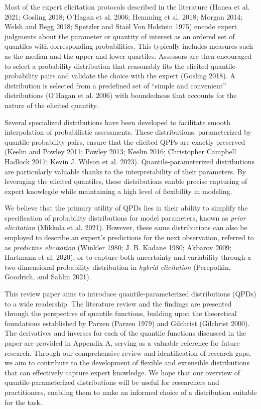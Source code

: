 \documentclass[
]{interact}
\begin{document}
Most of the expert elicitation protocols described in the literature
(Hanea et al. 2021; Gosling 2018; O'Hagan et al. 2006; Hemming et al.
2018; Morgan 2014; Welsh and Begg 2018; Spetzler and Staël Von Holstein
1975) encode expert judgments about the parameter or quantity of
interest as an ordered set of quantiles with corresponding
probabilities. This typically includes measures such as the median and
the upper and lower quartiles. Assessors are then encouraged to select a
probability distribution that reasonably fits the elicited
quantile-probability pairs and validate the choice with the expert
(Gosling 2018). A distribution is selected from a predefined set of
``simple and convenient'' distributions (O'Hagan et al. 2006) with
boundedness that accounts for the nature of the elicited quantity.

Several specialized distributions have been developed to facilitate
smooth interpolation of probabilistic assessments. These distributions,
parameterized by quantile-probability pairs, ensure that the elicited
QPPs are exactly preserved (Keelin and Powley 2011; Powley 2013; Keelin
2016; Christopher Campbell Hadlock 2017; Kevin J. Wilson et al. 2023).
Quantile-parameterized distributions are particularly valuable thanks to
the interpretability of their parameters. By leveraging the elicited
quantiles, these distributions enable precise capturing of expert
knowlegde while maintaining a high level of flexibility in modeling.

We believe that the primary utility of QPDs lies in their ability to
simplify the specification of probability distributions for model
parameters, known as \emph{prior elicitation} (Mikkola et al. 2021).
However, these same distributions can also be employed to describe an
expert's predictions for the next observation, referred to as
\emph{predictive elicitation} (Winkler 1980; J. B. Kadane 1980; Akbarov
2009; Hartmann et al. 2020), or to capture both uncertainty and
variability through a two-dimensional probability distribution in
\emph{hybrid elicitation} (Perepolkin, Goodrich, and Sahlin 2021).

This review paper aims to introduce quantile-parameterized distributions
(QPDs) to a wide readership. The literature review and the findings are
presented through the perspective of quantile functions, building upon
the theoretical foundations established by Parzen (Parzen 1979) and
Gilchrist (Gilchrist 2000). The derivatives and inverses for each of the
quantile functions discussed in the paper are provided in Appendix A,
serving as a valuable reference for future research. Through our
comprehensive review and identification of research gaps, we aim to
contribute to the development of flexible and extensible distributions
that can effectively capture expert knowledge. We hope that our overview
of quantile-parameterized distributions will be useful for researchers
and practitioners, enabling them to make an informed choice of a
distribution suitable for the task.
\end{document}
